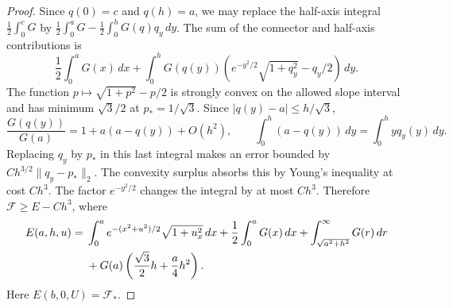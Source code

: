 \begin{proof}
Since \(q(0)=c\) and \(q(h)=a\), we may replace the half-axis integral
\(\tfrac12\int_0^c G\) by
\(\tfrac12\int_0^a G-\tfrac12\int_0^h G(q)q_y\,dy\).
The sum of the connector and half-axis contributions is
\[
 \frac12\int_0^a G(x)\,dx+
 \int_0^h G(q(y))\left(e^{-y^2/2}\sqrt{1+q_y^2}-q_y/2\right)\,dy .
\]
The function \(p\mapsto\sqrt{1+p^2}-p/2\) is strongly convex on the
allowed slope interval and has minimum \(\sqrt3/2\) at \(p_*=1/\sqrt3\).
Since \(|q(y)-a|\le h/\sqrt3\),
\[
 \frac{G(q(y))}{G(a)}=1+a(a-q(y))+O(h^2),\qquad
 \int_0^h (a-q(y))\,dy=\int_0^h y q_y(y)\,dy.
\]
Replacing \(q_y\) by \(p_*\) in this last integral makes an error bounded
by \(Ch^{3/2}\|q_y-p_*\|_2\). The convexity surplus absorbs this by
Young's inequality at cost \(Ch^3\). The factor \(e^{-y^2/2}\) changes
the integral by at most \(Ch^3\). Therefore \(\mathcal F\ge E-Ch^3\),
where
\begin{align}
 E(a,h,u)={}&
 \int_0^a e^{-(x^2+u^2)/2}\sqrt{1+u_x^2}\,dx
 +\frac12\int_0^a G(x)\,dx
 +\int_{\sqrt{a^2+h^2}}^\infty G(r)\,dr \notag\\
 &+G(a)\left(\frac{\sqrt3}{2}h+\frac a4h^2\right).
 \label{eq:effective}
\end{align}
Here \(E(b,0,U)=\mathcal F_*\).


\end{proof}
